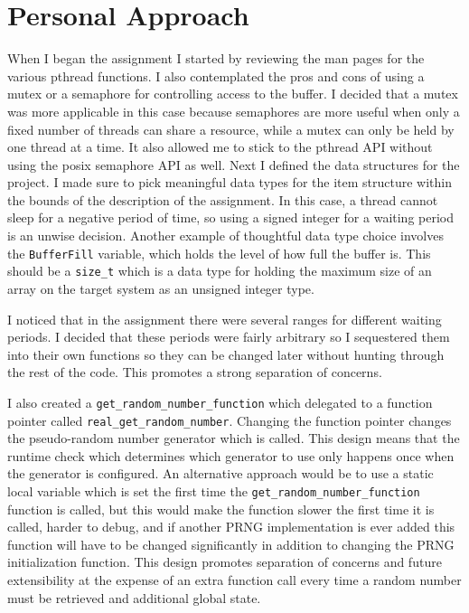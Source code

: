 \documentclass[10pt,conference,draftclsnofoot,onecolumn]{IEEEtran}
\begin{document}
\section{Personal Approach}
When I began the assignment I started by reviewing the man pages for the various pthread functions. I also contemplated the pros and cons of using a mutex or a semaphore for controlling access to the buffer. I decided that a mutex was more applicable in this case because semaphores are more useful when only a fixed number of threads can share a resource, while a mutex can only be held by one thread at a time. It also allowed me to stick to the pthread API without using the posix semaphore API as well. Next I defined the data structures for the project. I made sure to pick meaningful data types for the item structure within the bounds of the description of the assignment. In this case, a thread cannot sleep for a negative period of time, so using a signed integer for a waiting period is an unwise decision. Another example of thoughtful data type choice involves the \texttt{BufferFill} variable, which holds the level of how full the buffer is. This should be a \texttt{size\_t} which is a data type for holding the maximum size of an array on the target system as an unsigned integer type.

I noticed that in the assignment there were several ranges for different waiting periods. I decided that these periods were fairly arbitrary so I sequestered them into their own functions so they can be changed later without hunting through the rest of the code. This promotes a strong separation of concerns.

I also created a \texttt{get\_random\_number\_function} which delegated to a function pointer called \texttt{real\_get\_random\_number}. Changing the function pointer changes the pseudo-random number generator which is called. This design means that the runtime check which determines which generator to use only happens once when the generator is configured. An alternative approach would be to use a static local variable which is set the first time the \texttt{get\_random\_number\_function} function is called, but this would make the function slower the first time it is called, harder to debug, and if another PRNG implementation is ever added this function will have to be changed significantly in addition to changing the PRNG initialization function. This design promotes separation of concerns and future extensibility at the expense of an extra function call every time a random number must be retrieved and additional global state.
\end{document}
